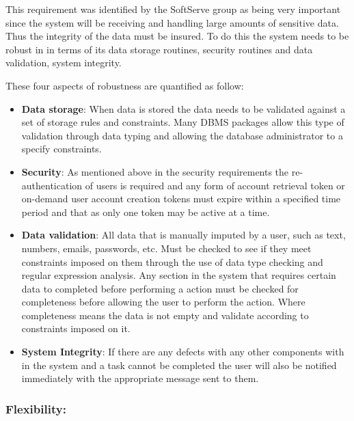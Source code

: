 \begin{flushleft}

This requirement was identified by the SoftServe group as being very important since the system will be receiving and handling large amounts of sensitive data. Thus the integrity of the data must be insured. To do this the system needs to be robust in in terms of its data storage routines, security routines and data validation, system integrity. 

These four aspects of robustness are quantified as follow:
\begin{itemize}
\item \textbf{Data storage}: When data is stored the data needs to be validated against a set of storage rules and constraints. Many DBMS packages allow this type of validation through data typing and allowing the database administrator to a specify constraints.
\item \textbf{Security}: As mentioned above in the security requirements the re-authentication of users is required and any form of account retrieval token or on-demand user account creation tokens must expire within a specified time period and that as only one token may be active at a time.
\item \textbf{Data validation}: All data that is manually imputed by a user, such as text, numbers, emails, passwords, etc. Must be checked to see if they meet constraints imposed on them through the use of data type checking and regular expression analysis. Any section in the system that requires certain data to completed before performing a action must be checked for completeness before allowing the user to perform the action. Where completeness means the data is not empty and validate according to constraints imposed on it.
\item \textbf{System Integrity}: If there are any defects with any other components with in the system and a task cannot be completed the user will also be notified immediately with the appropriate message sent to them.
\end{itemize}


\end{flushleft}

\vspace{0.1in}

\vspace{0.2in}

\subsubsection{Flexibility:}

